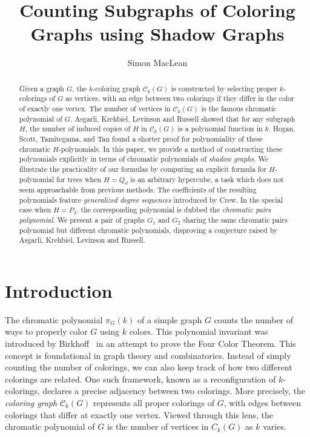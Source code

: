 \documentclass[12pt,reqno,dvipsnames]{amsart}
\title{Counting Subgraphs of Coloring Graphs using Shadow Graphs}
\author{Simon MacLean}
\theoremstyle{definition}
\begin{document}
\begin{abstract}
Given a graph $G$, the $k$-coloring graph $\mathcal{C}_k(G)$ is constructed by selecting proper $k$-colorings of $G$ as vertices, with an edge between two colorings if they differ in the color of exactly one vertex. The number of vertices in $\mathcal{C}_k(G)$ is the famous chromatic polynomial of $G$. Asgarli, Krehbiel, Levinson and Russell showed that for any subgraph $H$, the number of induced copies of $H$ in $\mathcal{C}_k(G)$ is a polynomial function in $k$. Hogan, Scott, Tamitegama, and Tan found a shorter proof for polynomiality of these chromatic $H$-polynomials. In this paper, we provide a method of constructing these polynomials explicitly in terms of chromatic polynomials of \emph{shadow graphs}. We illustrate the practicality of our formulas by computing an explicit formula for $H$-polynomial for trees when $H=Q_d$ is an arbitrary hypercube, a task which does not seem approachable from previous methods. The coefficients of the resulting polynomials feature \emph{generalized degree sequences} introduced by Crew. In the special case when $H=P_2$, the corresponding polynomial is dubbed the \emph{chromatic pairs polynomial}. We present a pair of graphs $G_1$ and $G_2$ sharing the same chromatic pairs polynomial but different chromatic polynomials, disproving a conjecture raised by Asgarli, Krehbiel, Levinson and Russell. 
\end{abstract}

\maketitle

\section{Introduction}

The chromatic polynomial $\pi_G(k)$ of a simple graph $G$ counts the number of ways to properly color $G$ using $k$ colors. This polynomial invariant was introduced by Birkhoff~\cite{Bir12} in an attempt to prove the Four Color Theorem. This concept is foundational in graph theory and combinatorics. Instead of simply counting the number of colorings, we can also keep track of how two different colorings are related. One such framework, known as a reconfiguration of $k$-colorings, declares a precise adjacency between two colorings. More precisely, the \emph{coloring graph} $\mathcal{C}_k(G)$ represents all proper colorings of $G$, with edges between colorings that differ at exactly one vertex. Viewed through this lens, the chromatic polynomial of $G$ is the number of vertices in $C_k(G)$ as $k$ varies.
\end{document}
